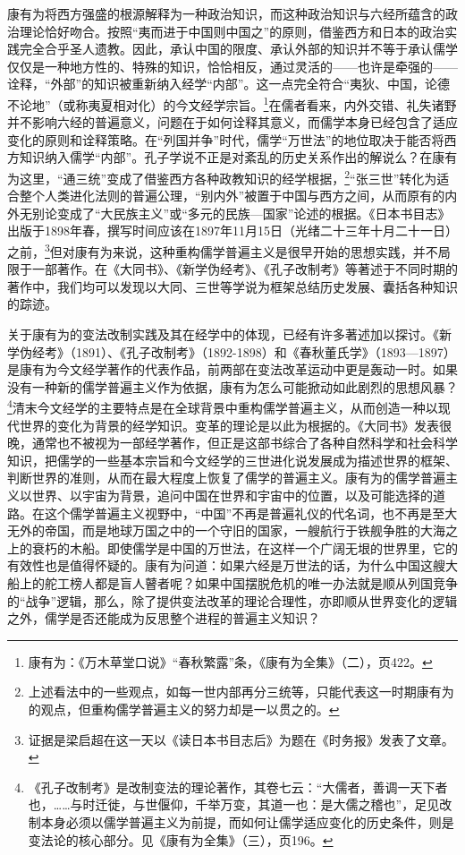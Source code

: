 \documentclass[a4paper, 12pt, openright]{ctexbook}
\begin{document}
康有为将西方强盛的根源解释为一种政治知识，而这种政治知识与六经所蕴含的政治理论恰好吻合。按照“夷而进于中国则中国之”的原则，借鉴西方和日本的政治实践完全合乎圣人遗教。因此，承认中国的限度、承认外部的知识并不等于承认儒学仅仅是一种地方性的、特殊的知识，恰恰相反，通过灵活的——也许是牵强的——诠释，“外部”的知识被重新纳入经学“内部”。这一点完全符合“夷狄、中国，论德不论地”（或称夷夏相对化）的今文经学宗旨。\footnote{康有为：《万木草堂口说》“春秋繁露”条，《康有为全集》（二），页422。}在儒者看来，内外交错、礼失诸野并不影响六经的普遍意义，问题在于如何诠释其意义，而儒学本身已经包含了适应变化的原则和诠释策略。在“列国并争”时代，儒学“万世法”的地位取决于能否将西方知识纳入儒学“内部”。孔子学说不正是对紊乱的历史关系作出的解说么？在康有为这里，“通三统”变成了借鉴西方各种政教知识的经学根据，\footnote{上述看法中的一些观点，如每一世内部再分三统等，只能代表这一时期康有为的观点，但重构儒学普遍主义的努力却是一以贯之的。}“张三世”转化为适合整个人类进化法则的普遍公理，“别内外”被置于中国与西方之间，从而原有的内外无别论变成了“大民族主义”或“多元的民族—国家”论述的根据。《日本书目志》出版于1898年春，撰写时间应该在1897年11月15日（光绪二十三年十月二十一日）之前，\footnote{证据是梁启超在这一天以《读日本书目志后》为题在《时务报》发表了文章。}但对康有为来说，这种重构儒学普遍主义是很早开始的思想实践，并不局限于一部著作。在《大同书》、《新学伪经考》、《孔子改制考》等著述于不同时期的著作中，我们均可以发现以大同、三世等学说为框架总结历史发展、囊括各种知识的踪迹。

关于康有为的变法改制实践及其在经学中的体现，已经有许多著述加以探讨。《新学伪经考》（1891）、《孔子改制考》（1892-1898）和《春秋董氏学》（1893—1897）是康有为今文经学著作的代表作品，前两部在变法改革运动中更是轰动一时。如果没有一种新的儒学普遍主义作为依据，康有为怎么可能掀动如此剧烈的思想风暴？\footnote{《孔子改制考》是改制变法的理论著作，其卷七云：“大儒者，善调一天下者也，……与时迁徙，与世偃仰，千举万变，其道一也：是大儒之稽也”，足见改制本身必须以儒学普遍主义为前提，而如何让儒学适应变化的历史条件，则是变法论的核心部分。见《康有为全集》（三），页196。}清末今文经学的主要特点是在全球背景中重构儒学普遍主义，从而创造一种以现代世界的变化为背景的经学知识。变革的理论是以此为根据的。《大同书》发表很晚，通常也不被视为一部经学著作，但正是这部书综合了各种自然科学和社会科学知识，把儒学的一些基本宗旨和今文经学的三世进化说发展成为描述世界的框架、判断世界的准则，从而在最大程度上恢复了儒学的普遍主义。康有为的儒学普遍主义以世界、以宇宙为背景，追问中国在世界和宇宙中的位置，以及可能选择的道路。在这个儒学普遍主义视野中，“中国”不再是普遍礼仪的代名词，也不再是至大无外的帝国，而是地球万国之中的一个守旧的国家，一艘航行于铁舰争胜的大海之上的衰朽的木船。即使儒学是中国的万世法，在这样一个广阔无垠的世界里，它的有效性也是值得怀疑的。康有为问道：如果六经是万世法的话，为什么中国这艘大船上的舵工榜人都是盲人瞽者呢？如果中国摆脱危机的唯一办法就是顺从列国竞争的“战争”逻辑，那么，除了提供变法改革的理论合理性，亦即顺从世界变化的逻辑之外，儒学是否还能成为反思整个进程的普遍主义知识？
\end{document}

